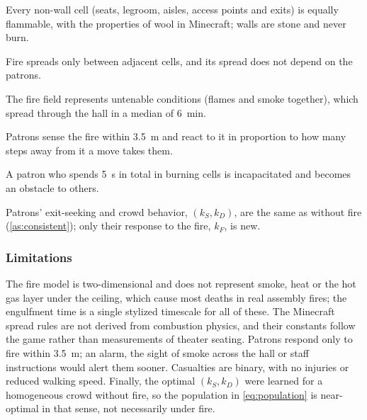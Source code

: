 \begin{assumption}
Every non-wall cell (seats, legroom, aisles, access points and exits) is equally
flammable, with the properties of wool in Minecraft; walls are stone and never burn.
\end{assumption}
\begin{assumption}
Fire spreads only between adjacent cells, and its spread does not depend on the patrons.
\end{assumption}
\begin{assumption}
The fire field represents untenable conditions (flames and smoke together), which spread
through the hall in a median of \SI{6}{min}.
\end{assumption}
\begin{assumption}
Patrons sense the fire within \SI{3.5}{m} and react to it in proportion to how many steps
away from it a move takes them.
\end{assumption}
\begin{assumption}
A patron who spends \SI{5}{s} in total in burning cells is incapacitated and becomes an
obstacle to others.
\end{assumption}
\begin{assumption}
Patrons' exit-seeking and crowd behavior, $(k_S, k_D)$, are the same as without fire
(\cref{as:consistent}); only their response to the fire, $k_F$, is new.
\end{assumption}

\subsubsection{Limitations}\label{sec:fire_limitations}

The fire model is two-dimensional and does not represent smoke, heat or the hot gas layer
under the ceiling, which cause most deaths in real assembly fires; the engulfment time is
a single stylized timescale for all of these. The Minecraft spread rules are not derived
from combustion physics, and their constants follow the game rather than measurements of
theater seating. Patrons respond only to fire within \SI{3.5}{m}; an alarm, the sight of
smoke across the hall or staff instructions would alert them sooner. Casualties are
binary, with no injuries or reduced walking speed. Finally, the optimal $(k_S, k_D)$ were
learned for a homogeneous crowd without fire, so the population in
\cref{eq:population} is near-optimal in that sense, not necessarily under fire.
